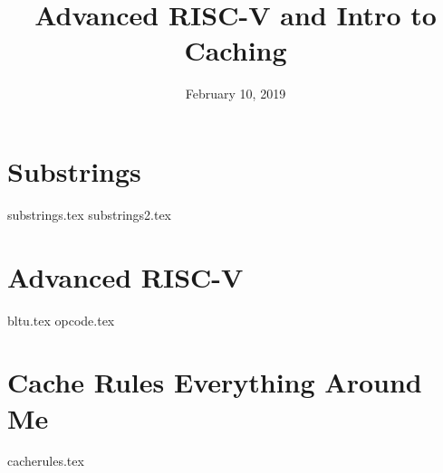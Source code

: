 \documentclass[11pt]{exam}
\title{Advanced RISC-V and Intro to Caching}
\date{February 10, 2019}
\begin{document}
\maketitle

\section{Substrings}
\begin{questions}
{substrings.tex}
{substrings2.tex}
\end{questions}
\newpage

\section{Advanced RISC-V}
\begin{questions}
{bltu.tex}
{opcode.tex}
\end{questions}
\newpage

\section{Cache Rules Everything Around Me}
\begin{questions}
{cacherules.tex}
\end{questions}
\newpage
\end{document}
